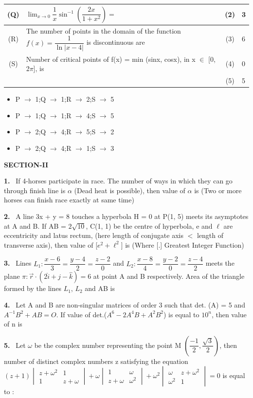 \documentclass[10pt]{extarticle}
\newcommand{\sect}[1]{\par\smallskip\noindent\textbf{#1}\par}
\newcommand{\qn}[1]{\par\smallskip\noindent\textbf{#1.}~}
\newenvironment{qoptions}{\begin{itemize}[leftmargin=1.8em,itemsep=1pt,topsep=2pt,label={}]}{\end{itemize}}
\newcommand{\opt}[2]{\item[(#1)] #2}
\begin{document}
\begin{multicols}{2}
{\begin{tabular}{|c|L{4.5cm}|c|L{0.5cm}|}
(Q) & $\displaystyle\lim_{x\to0}\dfrac1x\sin^{-1}\left(\dfrac{2x}{1+x^2}\right)=$ & (2) & 3\\ \hline
(R) & The number of points in the domain of the function $f(x)=\dfrac{1}{\ln|x-4|}$ is discontinuous are & (3) & 6\\ \hline
(S) & Number of critical points of f(x) = min (sinx, cosx), in x $\in$ [0, 2$\pi$], is & (4) & 0\\ \hline
 & & (5) & 5\\ \hline
\end{tabular}}\par
\begin{qoptions}
\opt{A}{P $\rightarrow$ 1;Q $\rightarrow$ 1;R $\rightarrow$ 2;S $\rightarrow$ 5}
\opt{B}{P $\rightarrow$ 1;Q $\rightarrow$ 1;R $\rightarrow$ 4;S $\rightarrow$ 5}
\opt{C}{P $\rightarrow$ 2;Q $\rightarrow$ 4;R $\rightarrow$ 5;S $\rightarrow$ 2}
\opt{D}{P $\rightarrow$ 2;Q $\rightarrow$ 4;R $\rightarrow$ 1;S $\rightarrow$ 3}
\end{qoptions}
\sect{SECTION-II}
\qn{1} If 4-horses participate in race. The number of ways in which they can go through finish line is $\alpha$ (Dead heat is possible), then value of $\alpha$ is (Two or more horses can finish race exactly at same time)
\qn{2} A line 3x + y = 8 touches a hyperbola H = 0 at P(1, 5) meets its asymptotes at A and B. If AB = $2\sqrt{10}$, C(1, 1) be the centre of hyperbola, e and $\ell$ are eccentricity and latus rectum, (here length of conjugate axis $<$ length of transverse axis), then value of [$e^2+\ell^2$] is (Where [.] Greatest Integer Function)
\qn{3} Lines $L_1:\dfrac{x-6}{3}=\dfrac{y-4}{2}=\dfrac{z-2}{0}$ and $L_2:\dfrac{x-8}{4}=\dfrac{y-2}{0}=\dfrac{z-4}{2}$ meets the plane $\pi:\vec r\cdot(2\hat i+\hat j-\hat k)=6$ at point A and B respectively. Area of the triangle formed by the lines $L_1$, $L_2$ and AB is
\qn{4} Let A and B are non-singular matrices of order 3 such that det. (A) = 5 and $A^{-1}B^2+AB=O$. If value of det.($A^6-2A^4B+A^2B^2$) is equal to $10^n$, then value of n is
\qn{5} Let $\omega$ be the complex number representing the point M $\left(\dfrac{-1}{2},\dfrac{\sqrt3}{2}\right)$, then number of distinct complex numbers z satisfying the equation $(z+1)\begin{vmatrix}z+\omega^2&1\\1&z+\omega\end{vmatrix}+\omega\begin{vmatrix}1&\omega\\z+\omega&\omega^2\end{vmatrix}+\omega^2\begin{vmatrix}\omega&z+\omega^2\\\omega^2&1\end{vmatrix}=0$ is equal to :

\end{multicols}
\end{document}

